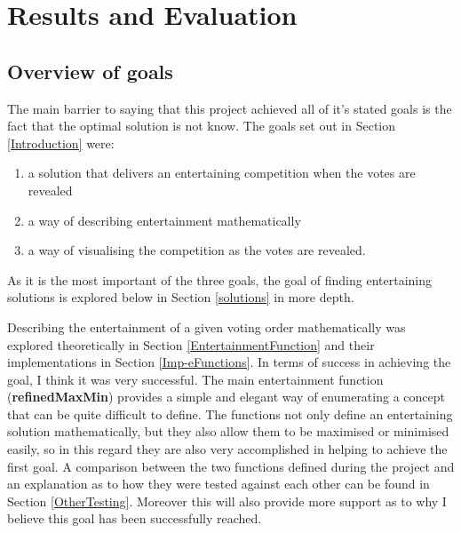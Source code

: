\documentclass[12pt]{report}
\begin{document}
\section{Results and Evaluation}\label{Results}
\subsection{Overview of goals}
The main barrier to saying that this project achieved all of it's stated goals is the fact that the optimal solution is not know. The goals set out in Section \ref{Introduction} were:
\begin{enumerate}
\item a solution that delivers an entertaining competition when the votes are revealed
\item a way of describing entertainment mathematically
\item a way of visualising the competition as the votes are revealed.
\end{enumerate}

As it is the most important of the three goals, the goal of finding entertaining solutions is explored below in Section \ref{solutions} in more depth.

Describing the entertainment of a given voting order mathematically was explored theoretically in Section \ref{EntertainmentFunction} and their implementations in Section \ref{Imp-eFunctions}. In terms of success in achieving the goal, I think it was very successful. The main entertainment function (\textbf{refinedMaxMin}) provides a simple and elegant way of enumerating a concept that can be quite difficult to define. The functions not only define an entertaining solution mathematically, but they also allow them to be maximised or minimised easily, so in this regard they are also very accomplished in helping to achieve the first goal. A comparison between the two functions defined during the project and an explanation as to how they were tested against each other can be found in Section \ref{OtherTesting}. Moreover this will also provide more support as to why I believe this goal has been successfully reached.
\end{document}

